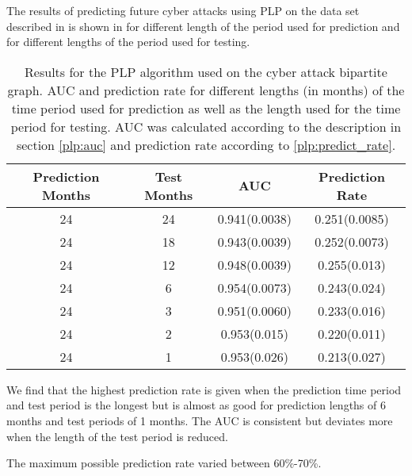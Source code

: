 The results of predicting future cyber attacks using PLP on the data set described in  is shown in  for different length of the period used for prediction and for different lengths of the period used for testing.
\begin{table}[!ht]
    \centering
    \begin{tabular}{|c|c|c|c|}
    \hline
        Prediction Months & Test Months & AUC            & Prediction Rate  \\ \hline
        24                & 24          & 0.941(0.0038)  & 0.251(0.0085)    \\
        24                & 18          & 0.943(0.0039)  & 0.252(0.0073)    \\
        24                & 12          & 0.948(0.0039)  & 0.255(0.013)     \\
        24                & 6           & 0.954(0.0073)  & 0.243(0.024)     \\
        24                & 3           & 0.951(0.0060)  & 0.233(0.016)     \\
        24                & 2           & 0.953(0.015)   & 0.220(0.011)     \\
        24                & 1           & 0.953(0.026)   & 0.213(0.027)     \\ \hline
    \end{tabular}
    \caption{\label{fig:plp_results} Results for the PLP algorithm used on the cyber attack bipartite graph. AUC and prediction rate for different lengths (in months) of the time period used for prediction as well as the length used for the time period for testing. AUC was calculated according to the description in section \ref{plp:auc} and prediction rate according to \ref{plp:predict_rate}.}
\end{table}

We find that the highest prediction rate is given when the prediction time period and test period is the longest but is almost as good for prediction lengths of 6 months and test periods of 1 months. The AUC is consistent but deviates more when the length of the test period is reduced.

The maximum possible prediction rate varied between 60\%-70\%.
